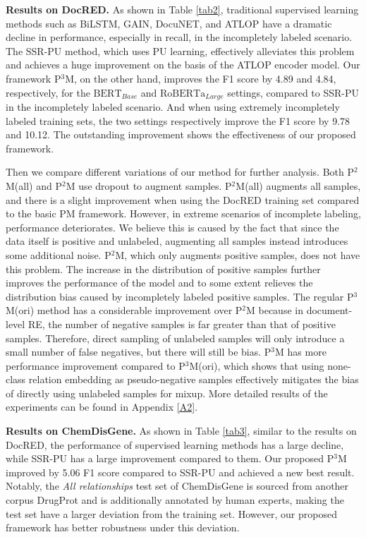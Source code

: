 \documentclass[11pt]{article}
\begin{document}
\textbf{Results on DocRED.} \enspace As shown in Table \ref{tab2}, traditional supervised learning methods such as BiLSTM, GAIN, DocuNET, and ATLOP have a dramatic decline in performance, especially in recall, in the incompletely labeled scenario. The SSR-PU method, which uses PU learning, effectively alleviates this problem and achieves a huge improvement on the basis of the ATLOP encoder model. Our framework P$^{3}$M, on the other hand, improves the F1 score by 4.89 and 4.84, respectively, for the $\mathrm{BERT}_{Base}$ and $\mathrm{RoBERTa}_{Large}$ settings, compared to SSR-PU in the incompletely labeled scenario. And when using extremely incompletely labeled training sets, the two settings respectively improve the F1 score by 9.78 and 10.12. The outstanding improvement shows the effectiveness of our proposed framework.

Then we compare different variations of our method for further analysis. Both P$^{2}$M(all) and P$^{2}$M use dropout to augment samples. P$^{2}$M(all) augments all samples, and there is a slight improvement when using the DocRED training set compared to the basic PM framework. However, in extreme scenarios of incomplete labeling, performance deteriorates. We believe this is caused by the fact that since the data itself is positive and unlabeled, augmenting all samples instead introduces some additional noise. P$^{2}$M, which only augments positive samples, does not have this problem. The increase in the distribution of positive samples further improves the performance of the model and to some extent relieves the distribution bias caused by incompletely labeled positive samples. The regular P$^{3}$M(ori) method has a considerable improvement over P$^{2}$M because in document-level RE, the number of negative samples is far greater than that of positive samples. Therefore, direct sampling of unlabeled samples will only introduce a small number of false negatives, but there will still be bias. P$^{3}$M has more performance improvement compared to P$^{3}$M(ori), which shows that using none-class relation embedding as pseudo-negative samples effectively mitigates the bias of directly using unlabeled samples for mixup. More detailed results of the experiments can be found in Appendix \ref{A2}.

\textbf{Results on ChemDisGene.} \enspace As shown in Table \ref{tab3}, similar to the results on DocRED, the performance of supervised learning methods has a large decline, while SSR-PU has a large improvement compared to them. Our proposed P$^{3}$M improved by 5.06 F1 score compared to SSR-PU and achieved a new best result. Notably, the \emph{All relationships} test set of ChemDisGene is sourced from another corpus DrugProt \citep{miranda2021overview} and is additionally annotated by human experts, making the test set have a larger deviation from the training set. However, our proposed framework has better robustness under this deviation.
\end{document}
